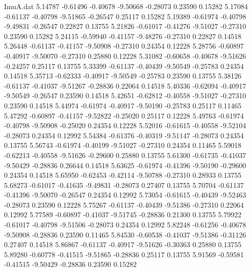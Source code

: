 \begin{filecontents}{ImuA.dat}
   5.14787   -0.61496   -0.40678   -9.50668   -0.28073    0.23590    0.15282
   5.17084   -0.61137   -0.40798   -9.51865   -0.26547    0.25117    0.15282
   5.19389   -0.61974   -0.40798   -9.49831   -0.26547    0.22827    0.13755
   5.21826   -0.61017   -0.41276   -9.51027   -0.27310    0.23590    0.15282
   5.24115   -0.59940   -0.41157   -9.48276   -0.27310    0.22827    0.14518
   5.26448   -0.61137   -0.41157   -9.50908   -0.27310    0.24354    0.12228
   5.28756   -0.60897   -0.40917   -9.50070   -0.27310    0.25880    0.12228
   5.31082   -0.60658   -0.40678   -9.51626   -0.24257    0.25117    0.13755
   5.33399   -0.61137   -0.40439   -9.50549   -0.25783    0.24354    0.14518
   5.35713   -0.62333   -0.40917   -9.50549   -0.25783    0.23590    0.13755
   5.38126   -0.61137   -0.41037   -9.51267   -0.28836    0.22064    0.14518
   5.40336   -0.62094   -0.40917   -9.50549   -0.26547    0.23590    0.14518
   5.42651   -0.62812   -0.40558   -9.51027   -0.27310    0.23590    0.14518
   5.44974   -0.61974   -0.40917   -9.50190   -0.25783    0.25117    0.11465
   5.47292   -0.60897   -0.41157   -9.52822   -0.25020    0.25117    0.12228
   5.49763   -0.61974   -0.40798   -9.50908   -0.25020    0.24354    0.12228
   5.52016   -0.61615   -0.40558   -9.52104   -0.28073    0.24354    0.12992
   5.54384   -0.61376   -0.40319   -9.51147   -0.28073    0.24354    0.13755
   5.56743   -0.61974   -0.40199   -9.51027   -0.27310    0.24354    0.11465
   5.59018   -0.62213   -0.40558   -9.51626   -0.29600    0.25880    0.13755
   5.61300   -0.61735   -0.41037   -9.50429   -0.28836    0.26644    0.14518
   5.63625   -0.61974   -0.41396   -9.50190   -0.29600    0.24354    0.14518
   5.65950   -0.62453   -0.42114   -9.50788   -0.27310    0.28933    0.13755
   5.68273   -0.61017   -0.41635   -9.49831   -0.28073    0.27407    0.13755
   5.70704   -0.61137   -0.41396   -9.50070   -0.26547    0.24354    0.12992
   5.73054   -0.61615   -0.40439   -9.52463   -0.28073    0.23590    0.12228
   5.75267   -0.61137   -0.40439   -9.51386   -0.27310    0.22064    0.12992
   5.77589   -0.60897   -0.41037   -9.51745   -0.28836    0.21300    0.13755
   5.79922   -0.61017   -0.40798   -9.51506   -0.28073    0.24354    0.12992
   5.82248   -0.61256   -0.40678   -9.50908   -0.28836    0.23590    0.11465
   5.84530   -0.60538   -0.41037   -9.51386   -0.31126    0.27407    0.14518
   5.86867   -0.61137   -0.40917   -9.51626   -0.30363    0.25880    0.13755
   5.89280   -0.60778   -0.41515   -9.51865   -0.28836    0.25117    0.13755
   5.91569   -0.59581   -0.41515   -9.50429   -0.28836    0.23590    0.15282

\end{filecontents}
